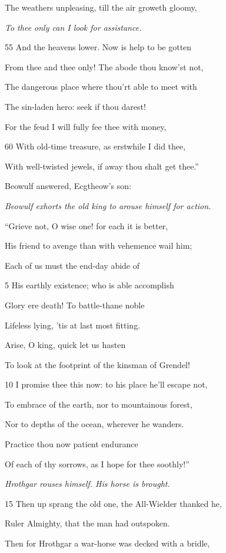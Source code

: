 The weathers unpleasing, till the air groweth gloomy,

\emph{To thee only can I
look for assistance.}

55
And the heavens lower. Now is help to be gotten

From thee and thee only! The abode thou know’st not,

The dangerous place where thou’rt able to meet with

The sin-laden hero: seek if thou darest!

For the feud I will fully fee thee with money,

60
With old-time treasure, as erstwhile I did thee,

With well-twisted jewels, if away thou shalt get thee.”



Beowulf answered, Ecgtheow’s son:

\emph{Beowulf exhorts
the old king to
arouse himself for
action.}

“Grieve not, O wise one! for each it is better,

His friend to avenge than with vehemence wail him;

Each of us must the end-day abide of

5
His earthly existence; who is able accomplish

Glory ere death! To battle-thane noble

Lifeless lying, ’tis at last most fitting.

Arise, O king, quick let us hasten

To look at the footprint of the kinsman of Grendel!

10
I promise thee this now: to his place he’ll escape not,

To embrace of the earth, nor to mountainous forest,

Nor to depths of the ocean, wherever he wanders.

Practice thou now patient endurance

Of each of thy sorrows, as I hope for thee soothly!”

\emph{Hrothgar rouses
himself. His horse
is brought.}

15
Then up sprang the old one, the All-Wielder thanked he,

Ruler Almighty, that the man had outspoken.

Then for Hrothgar a war-horse was decked with a bridle,

